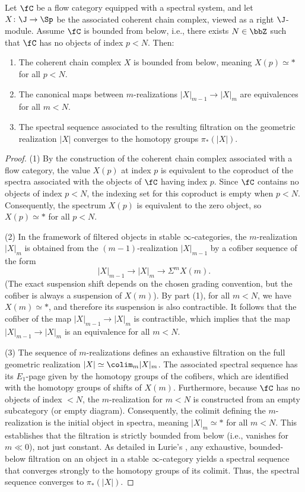 \begin{lem}
    Let $\fC$ be a flow category equipped with a spectral system, and let $X \colon \J \to \Sp$ be the associated coherent chain complex, viewed as a right $\J$-module. Assume $\fC$ is bounded from below, i.e., there exists $N \in \bbZ$ such that $\fC$ has no objects of index $p < N$. Then:
    \begin{enumerate}
        \item The coherent chain complex $X$ is bounded from below, meaning $X(p) \simeq *$ for all $p < N$.
        \item The canonical maps between $m$-realizations $|X|_{m-1} \to |X|_m$ are equivalences for all $m < N$.
        \item The spectral sequence associated to the resulting filtration on the geometric realization $|X|$ converges to the homotopy groups $\pi_*(|X|)$.
    \end{enumerate}
\end{lem}

\begin{proof}
    (1) By the construction of the coherent chain complex associated with a flow category, the value $X(p)$ at index $p$ is equivalent to the coproduct of the spectra associated with the objects of $\fC$ having index $p$. Since $\fC$ contains no objects of index $p < N$, the indexing set for this coproduct is empty when $p < N$. Consequently, the spectrum $X(p)$ is equivalent to the zero object, so $X(p) \simeq *$ for all $p < N$.

    (2) In the framework of filtered objects in stable $\infty$-categories, the $m$-realization $|X|_m$ is obtained from the $(m-1)$-realization $|X|_{m-1}$ by a cofiber sequence of the form
    \[
        |X|_{m-1} \to |X|_m \to \Sigma^{m} X(m).
    \]
    (The exact suspension shift depends on the chosen grading convention, but the cofiber is always a suspension of $X(m)$). By part (1), for all $m < N$, we have $X(m) \simeq *$, and therefore its suspension is also contractible. It follows that the cofiber of the map $|X|_{m-1} \to |X|_m$ is contractible, which implies that the map $|X|_{m-1} \to |X|_m$ is an equivalence for all $m < N$.

    (3) The sequence of $m$-realizations defines an exhaustive filtration on the full geometric realization $|X| \simeq \colim_m |X|_m$. The associated spectral sequence has its $E_1$-page given by the homotopy groups of the cofibers, which are identified with the homotopy groups of shifts of $X(m)$. Furthermore, because $\fC$ has no objects of index $<N$, the $m$-realization for $m < N$ is constructed from an empty subcategory (or empty diagram). Consequently, the colimit defining the $m$-realization is the initial object in spectra, meaning $|X|_m \simeq *$ for all $m < N$. This establishes that the filtration is strictly bounded from below (i.e., vanishes for $m \ll 0$), not just constant. As detailed in Lurie's \cite[Section~1.2.2]{Lur17}, any exhaustive, bounded-below filtration on an object in a stable $\infty$-category yields a spectral sequence that converges strongly to the homotopy groups of its colimit. Thus, the spectral sequence converges to $\pi_*(|X|)$.
\end{proof}
